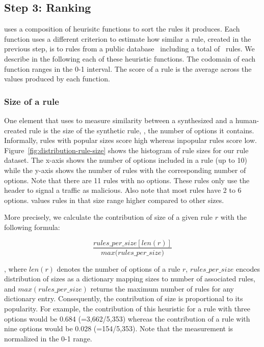 \documentclass[sigconf,review, anonymous]{acmart}
\begin{document}
\subsection{Step 3: Ranking}

\tname{} uses a composition of heurisitc functions to sort the rules
it produces. Each function uses a different criterion to estimate how
similar a rule, created in the previous step, is to rules from a
public database~\cite{emerging-threats-open} including a total of
\numrulessuri\ rules. We describe in the following each of these
heuristic functions. The codomain of each function ranges in the 0-1
interval. The score of a rule is the average across the values
produced by each function.


\subsubsection{Size of a rule}
One element that \tname{} uses to measure similarity between a
synthesized and a human-created rule is the size of the synthetic
rule, \ie{}, the number of options it contains. Informally, rules with
popular sizes score high whereas inpopular rules score
low. Figure~\ref{fig:distribution-rule-size} shows the histogram of
rule sizes for our rule dataset. The x-axis shows the number of
options included in a rule (up to 10) while the y-axis shows the
number of rules with the corresponding number of options. Note that
there are 11 rules with no options. These rules only use the header to
signal a traffic as malicious. Also note that most rules have 2 to 6
options. \tname{} values rules in that size range higher compared to
other sizes.






More precisely, we calculate the contribution of size of a given rule
$r$ with the following formula:

\[\frac{\mathit{rules\_per\_size}[\mathit{len(r)}]}{\mathit{max(rules\_per\_size})}\]

\noindent
, where $\mathit{len(r)}$ denotes the number of options of a rule $r$,
$\mathit{rules\_per\_size}$ encodes distribution of sizes as a
dictionary mapping sizes to number of associated rules, and
$\mathit{max(rules\_per\_size)}$ returns the maximum number of rules
for any dictionary entry. Consequently, the contribution of size is
proportional to its popularity. For example, the contribution of this
heuristic for a rule with three options would be 0.684 (=3,662/5,353)
whereas the contribution of a rule with nine options would be 0.028
(=154/5,353). Note that the measurement is normalized in the 0-1
range.
\end{document}
